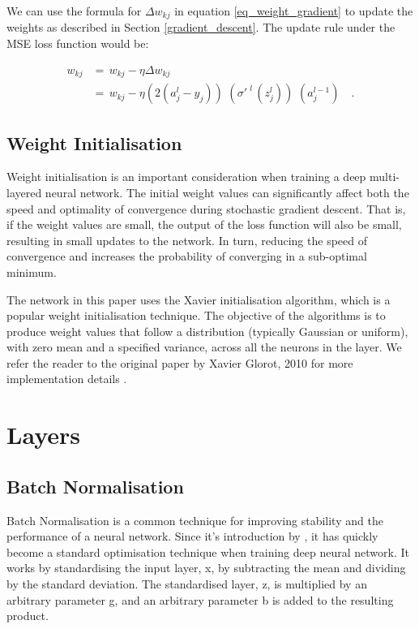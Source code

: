             We can use the formula for $\Delta w_{kj}$ in equation \ref{eq_weight_gradient} to update the weights as described in Section \ref{gradient_descent}. The update rule under the MSE loss function would be:
            
            \begin{align}
                w_{kj} 
                & = \,  
                 w_{kj} - \eta \Delta w_{kj} 
                \nonumber \\
                & = \,
                     w_{kj} - \eta \left( 2(a^{l}_{j} - y_{j}) \right) \,\, \left( \sigma'^{\,\,l}{\,(z^{l}_{j}) } \right) \,\, \left( a^{l-1}_{j} \right) \quad . 
            \end{align}
            
    \subsection{Weight Initialisation} \label{weight_initalisation}             
        Weight initialisation is an important consideration when training a deep multi-layered neural network. The initial weight values can significantly affect both the speed and optimality of convergence during stochastic gradient descent. That is, if the weight values are small, the output of the loss function will also be small, resulting in small updates to the network. In turn, reducing the speed of convergence and increases the probability of converging in a sub-optimal minimum.
        
        The network in this paper uses the Xavier initialisation algorithm, which is a popular weight initialisation technique. The objective of the algorithms is to produce weight values that follow a distribution (typically Gaussian or uniform), with zero mean and a specified variance, across all the neurons in the layer. We refer the reader to the original paper by Xavier Glorot, 2010 for more implementation details \cite{xavier_weight_initalisation}. 
        
\section{Layers}
    \subsection{Batch Normalisation} \label{batch_norm_sec}
        Batch Normalisation is a common technique for improving stability and the performance of a neural network. Since it's introduction by \cite{batch_normalisation}, it has quickly become a standard optimisation technique when training deep neural network. It works by standardising the input layer, x, by subtracting the mean and dividing by the standard deviation. The standardised layer, z, is multiplied by an arbitrary parameter g, and an arbitrary parameter b is added to the resulting product. 

